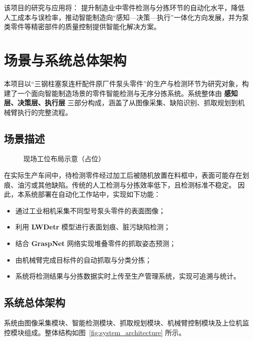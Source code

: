 \documentclass{cumcmthesis}
\begin{document}
该项目的研究与应用将：
提升制造业中零件检测与分拣环节的自动化水平，降低人工成本与误检率，推动智能制造向“感知—决策—执行”一体化方向发展，并为泵类零件等精密部件的质量控制提供智能化解决方案。

\section{场景与系统总体架构}

本项目以“三钢柱塞泵连杆配件原厂件泵头零件”的生产与检测环节为研究对象，构建了一个面向智能制造场景的零件智能检测与无序分拣系统。系统整体由 \textbf{感知层、决策层、执行层} 三部分构成，涵盖了从图像采集、缺陷识别、抓取规划到机械臂执行的完整流程。

\subsection{场景描述}

\begin{figure}[htbp]\centering
{}
\caption{现场工位布局示意（占位）}\label{fig:cell_layout}
\end{figure}
在实际生产车间中，待检测零件经过加工后被随机放置在料框中，表面可能存在划痕、油污或其他缺陷。传统的人工检测与分拣效率低下，且检测标准不稳定。  
因此，本系统部署在自动化工作站中，实现如下功能：

\begin{itemize}
    \item 通过工业相机采集不同型号泵头零件的表面图像；
    \item 利用 \textbf{LWDetr} 模型进行表面划痕、脏污缺陷检测；
    \item 结合 \textbf{GraspNet} 网络实现堆叠零件的抓取姿态预测；
    \item 由机械臂完成目标件的自动抓取与分类分拣；
    \item 系统将检测结果与分拣数据实时上传至生产管理系统，实现可追溯与统计。
\end{itemize}

\subsection{系统总体架构}

系统由图像采集模块、智能检测模块、抓取规划模块、机械臂控制模块及上位机监控模块组成。整体结构如图~\ref{fig:system_architecture} 所示。
\end{document}
